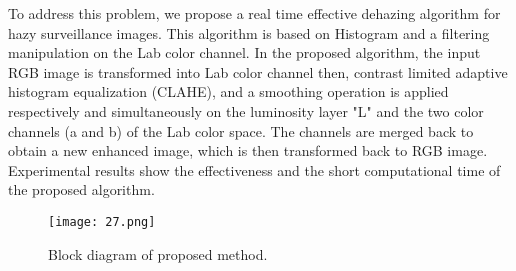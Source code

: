 \documentclass[doctor,english,listoffigures,listoftables]{thesis-uestc}
\begin{document}
To address this problem, we propose a real time effective dehazing algorithm for hazy surveillance images. This algorithm is based on Histogram and a filtering manipulation on the Lab color channel. In the proposed algorithm, the input RGB image is transformed into Lab color channel then, contrast limited adaptive histogram equalization (CLAHE), and a smoothing operation is applied respectively and simultaneously on the luminosity layer "L" and the two color channels (a and b) of the Lab color space. The channels are merged back to obtain a new enhanced image, which is then transformed back to RGB image. Experimental results show the effectiveness and the short computational time of the proposed algorithm.
\begin{figure*}
	\centering
	\texttt{[image: 27.png]}
	\caption{Block diagram of proposed method.}
	\label{fig:12}
\end{figure*}
\end{document}
